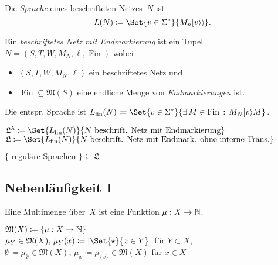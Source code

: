 \documentclass{cheat-sheet}
\newcommand{\activeTransition}[1]{[{#1}\rangle} %
\newcommand{\labelledTransition}[1]{[{#1}\rangle\rangle} %
\newcommand{\Markings}{\mathfrak{M}} %
\DeclareMathOperator{\Fin}{Fin} %
\newcommand{\Lang}{\mathfrak{L}} %
\newcommand{\fin}{\mathrm{fin}} %
\newcommand{\Multisets}{\mathfrak{M}} %
\begin{document}
\begin{defn}
  Die \emph{Sprache} eines beschrifteten Netzes~$N$ ist
  \[
    L(N) \coloneqq \Set{v \in \Sigma^{*}}{M_n \labelledTransition{v}}.
  \]
\end{defn}

\begin{defn}
  Ein \emph{beschriftetes Netz mit Endmarkierung} ist ein Tupel $N = (S, T, W, M_N, \ell, \Fin)$ wobei
  \begin{itemize}
    \item $(S, T, W, M_N, \ell)$ ein beschriftetes Netz und
    \item $\Fin \subseteq \Markings(S)$ eine endliche Menge von \textit{Endmarkierungen} ist.
  \end{itemize}
  Die entspr. Sprache ist $L_\fin(N) \coloneqq \Set{v \in \Sigma^{*}}{\ex{M \in \Fin} M_N \activeTransition{v} M}$.
\end{defn}

\begin{nota}
  $\Lang^\lambda \coloneqq \Set{L_\fin(N)}{N \text{ beschrift. Netz mit Endmarkierung}}$ \\
  $\Lang \coloneqq \Set{L_\fin(N)}{N \text{ beschrift. Netz mit Endmark. ohne interne Trans.}}$
\end{nota}

\begin{satz}
  $\{ \text{ reguläre Sprachen } \} \subseteq \Lang$
\end{satz}

\subsection{Nebenläufigkeit I}

\begin{defn}
  Eine Multimenge über~$X$ ist eine Funktion $\mu : X \to \mathbb{N}$.
\end{defn}

\begin{nota}
  \begin{minipage}[t]{0.8 \linewidth}
    $\Multisets(X) \coloneqq \{ \mu : X \to \N \}$ \\
    $\mu_Y \in \Multisets(X), \, \mu_Y(x) \coloneqq \card{\Set{\star}{x \in Y}}$ für $Y \subset X$, \\
    $\emptyset \coloneqq \mu_\emptyset \in \Multisets(X)$, \enspace
    $\mu_x \coloneqq \mu_{\{ x \}} \in \Multisets(X)$ für $x \in X$
  \end{minipage}
\end{nota}
\end{document}

